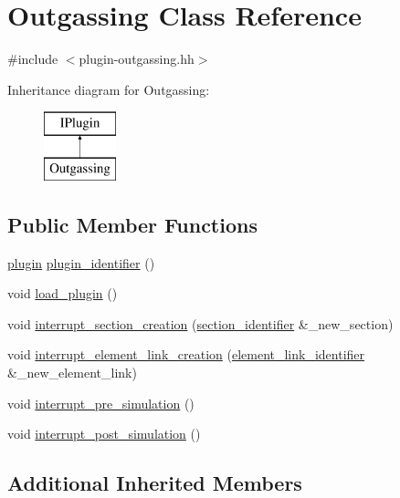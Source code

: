 \hypertarget{classOutgassing}{}\section{Outgassing Class Reference}
\label{classOutgassing}


{\ttfamily \#include $<$plugin-\/outgassing.\+hh$>$}

Inheritance diagram for Outgassing\+:\begin{figure}[H]
\begin{center}
\leavevmode
\includegraphics[height=2.000000cm]{classOutgassing}
\end{center}
\end{figure}
\subsection*{Public Member Functions}
\begin{DoxyCompactItemize}
\item 
\hyperlink{plugins_8hh_af34747f68f9b0963dea6e8f3c659659c}{plugin} \hyperlink{classOutgassing_a35c522220af5add597f30bcf2a07df68}{plugin\+\_\+identifier} ()
\item 
void \hyperlink{classOutgassing_aa999ed92df7cc8858da8f877db1c6bf3}{load\+\_\+plugin} ()
\item 
void \hyperlink{classOutgassing_a5a1afcb787654cb41df8ee91f88dee21}{interrupt\+\_\+section\+\_\+creation} (\hyperlink{structsection__identifier}{section\+\_\+identifier} \&\+\_\+new\+\_\+section)
\item 
void \hyperlink{classOutgassing_a71237bfa8220b867ba35a360fd5f869f}{interrupt\+\_\+element\+\_\+link\+\_\+creation} (\hyperlink{structelement__link__identifier}{element\+\_\+link\+\_\+identifier} \&\+\_\+new\+\_\+element\+\_\+link)
\item 
void \hyperlink{classOutgassing_a7c51e9f9622f1533904efc719b353f55}{interrupt\+\_\+pre\+\_\+simulation} ()
\item 
void \hyperlink{classOutgassing_a1c3cb8741c2cdc09e807db1d77a3808a}{interrupt\+\_\+post\+\_\+simulation} ()
\end{DoxyCompactItemize}
\subsection*{Additional Inherited Members}


